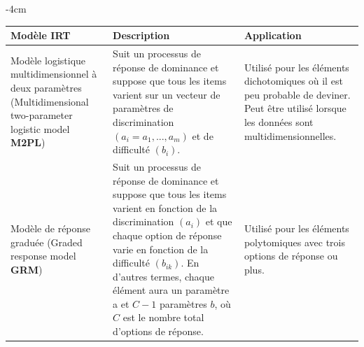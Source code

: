 \begin{table}[H]
	\centering
	\addtolength{\leftskip} {-4cm}
	\addtolength{\rightskip}{-4.5cm}
	\begin{tabular}{|m{4cm}|m{6cm}|m{6cm}|}
	\hline
	\textbf{Modèle IRT} & \textbf{Description} & \textbf{Application} \\ \hline
	Modèle logistique multidimensionnel à deux paramètres (Multidimensional two-parameter logistic model \textbf{M2PL}) & Suit un processus de réponse de dominance et suppose que tous les items varient sur un vecteur de paramètres de discrimination \(\displaystyle (a_{i} = a_{1},...,a_{m} )\) et de difficulté \(\displaystyle (b_{i})\). & Utilisé pour les éléments dichotomiques où il est peu probable de deviner. Peut être utilisé lorsque les données sont multidimensionnelles.\\ \hline
	Modèle de réponse graduée (Graded response model \textbf{GRM}) & Suit un processus de réponse de dominance et suppose que tous les items varient en fonction de la discrimination \(\displaystyle (a_{i})\) et que chaque option de réponse varie en fonction de la difficulté \(\displaystyle (b_{ik})\). En d'autres termes, chaque élément aura un paramètre a et \(\displaystyle C - 1 \) paramètres \(\displaystyle b \), où \(\displaystyle C \) est le nombre total d'options de réponse. & Utilisé pour les éléments polytomiques avec trois options de réponse ou plus.\\ \hline

\end{tabular}
\end{table}
